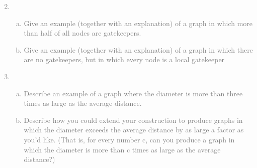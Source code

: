 \documentclass[11pt]{article}
\begin{document}
\textcolor{gray}{
\begin{enumerate}
\setcounter{enumi}{1}
	\item \quad \\
	\begin{enumerate}[(a)]
		\item Give an example (together with an explanation) of a graph in which more than half of all nodes are gatekeepers.
		\item Give an example (together with an explanation) of a graph in which there are no gatekeepers, but in which every node is a local gatekeeper
	\end{enumerate}
\end{enumerate}
}

\textcolor{gray}{
\begin{enumerate}
\setcounter{enumi}{2}
	\item \quad \\
	\begin{enumerate}[(a)]
		\item Describe an example of a graph where the diameter is more than three times as large as the average distance.\\
		\item Describe how you could extend your construction to produce graphs in which the diameter exceeds the average distance by as large a factor as you’d like. (That is, for every number c, can you produce a graph in which the diameter is more than c times as large as the average distance?)\\
	\end{enumerate}
\end{enumerate}
}
\end{document}
